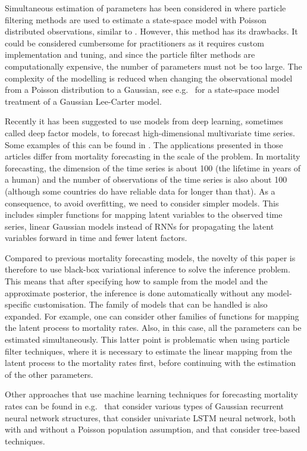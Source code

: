 \documentclass[11pt]{article}
\begin{document}
Simultaneous estimation of parameters has been considered in \cite{andersson2020mortality} where particle filtering methods are used to estimate a state-space model with Poisson distributed observations, similar to \cite{brouhns2002poisson}. However, this method has its drawbacks. It could be considered cumbersome for practitioners as it requires custom implementation and tuning, and since the particle filter methods are computationally expensive, the number of parameters must not be too large. The complexity of the modelling is reduced when changing the observational model from a Poisson distribution to a Gaussian, see e.g.\ \cite{de2006extending} for a state-space model treatment of a Gaussian Lee-Carter model.

Recently it has been suggested to use models from deep learning, sometimes called deep factor models, to forecast high-dimensional multivariate time series. Some examples of this can be found in \cite{nguyen2021temporal, wang2019deep, salinas2020deepar, rangapuram2018deep}. The applications presented in those articles differ from mortality forecasting in the scale of the problem. In mortality forecasting, the dimension of the time series is about 100 (the lifetime in years of a human) and the number of observations of the time series is also about 100 (although some countries do have reliable data for longer than that). As a consequence, to avoid overfitting, we need to consider simpler models. This includes simpler functions for mapping latent variables to the observed time series, linear Gaussian models instead of RNNs for propagating the latent variables forward in time and fewer latent factors.

Compared to previous mortality forecasting models, the novelty of this paper is therefore to use black-box variational inference \citep{ranganath2014black} to solve the inference problem. This means that after specifying how to sample from the model and the approximate posterior, the inference is done automatically without any model-specific customisation. The family of models that can be handled is also expanded. For example, one can consider other families of functions for mapping the latent process to mortality rates. Also, in this case, all the parameters can be estimated simultaneously. This latter point is problematic when using particle filter techniques, where it is necessary to estimate the linear mapping from the latent process to the mortality rates first, before continuing with the estimation of the other parameters.

Other approaches that use machine learning techniques for forecasting mortality rates can be found in e.g.\ \cite{richman2019lee,richman2021neural,perla2021time} that consider various types of Gaussian recurrent neural network structures, \cite{nigri2019deep,marino2020measuring,lindholm2022efficient} that consider univariate LSTM neural network, both with and without a Poisson population assumption, and \cite{deprez2017machine} that consider tree-based techniques.
\end{document}
